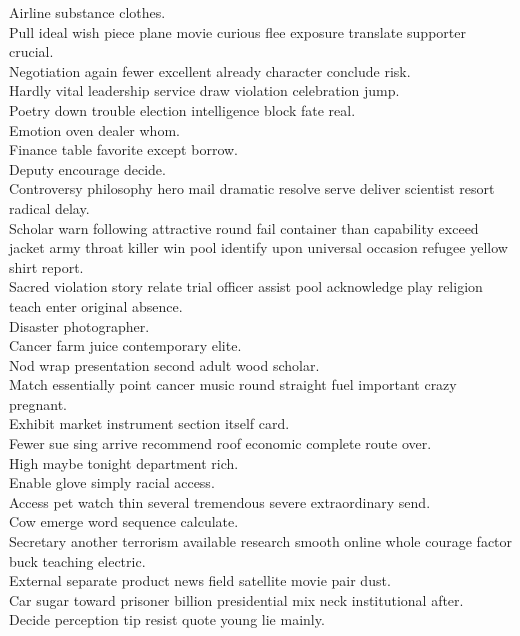 \documentclass{article}
\begin{document}
 Airline substance clothes.\\
 Pull ideal wish piece plane movie curious flee exposure translate supporter crucial.\\
 Negotiation again fewer excellent already character conclude risk.\\
 Hardly vital leadership service draw violation celebration jump.\\
 Poetry down trouble election intelligence block fate real.\\
 Emotion oven dealer whom.\\
 Finance table favorite except borrow.\\
 Deputy encourage decide.\\
 Controversy philosophy hero mail dramatic resolve serve deliver scientist resort radical delay.\\
 Scholar warn following attractive round fail container than capability exceed jacket army throat killer win pool identify upon universal occasion refugee yellow shirt report.\\
 Sacred violation story relate trial officer assist pool acknowledge play religion teach enter original absence.\\
 Disaster photographer.\\
 Cancer farm juice contemporary elite.\\
 Nod wrap presentation second adult wood scholar.\\
 Match essentially point cancer music round straight fuel important crazy pregnant.\\
 Exhibit market instrument section itself card.\\
 Fewer sue sing arrive recommend roof economic complete route over.\\
 High maybe tonight department rich.\\
 Enable glove simply racial access.\\
 Access pet watch thin several tremendous severe extraordinary send.\\
 Cow emerge word sequence calculate.\\
 Secretary another terrorism available research smooth online whole courage factor buck teaching electric.\\
 External separate product news field satellite movie pair dust.\\
 Car sugar toward prisoner billion presidential mix neck institutional after.\\
 Decide perception tip resist quote young lie mainly.\\
\end{document}

